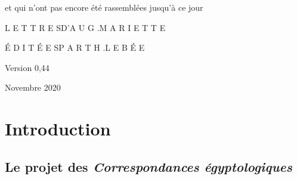 \documentclass{book}
\begin{document}
\begin{titlepage}
et qui n’ont pas encore été rassemblées jusqu’à ce jour
\vspace{9\baselineskip}

\LARGE L E T T R E S\space\space\space D\space ’\space A U G .\space\space\space M A R I E T T E
\vspace{4\baselineskip}

\normalsize É D I T É E S\space\space\space P A R \space\space\space T H .\space\space\space L E B É E
\vspace{4\baselineskip}

Version 0,44
\vspace{1\baselineskip}

Novembre 2020
\end{titlepage}
\thispagestyle{empty}
\chapter*{Introduction}
\setcounter{page}{1}

\section*{Le projet des \textit{Correspondances égyptologiques}}
\end{document}
